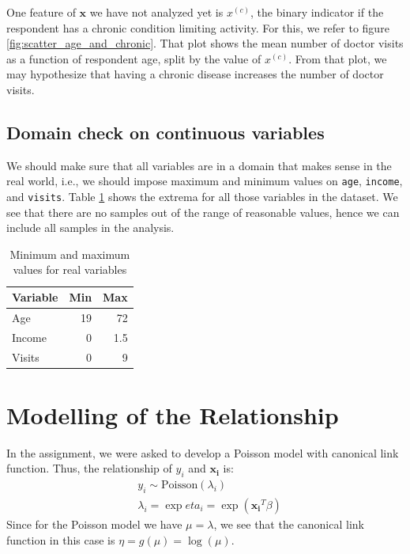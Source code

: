 \documentclass[a4paper,11pt]{article}
\begin{document}
One feature of $\mathbf{x}$ we have not analyzed yet is $x^{(c)}$, the binary indicator if the respondent has a chronic condition limiting activity. For this, we refer to figure \ref{fig:scatter_age_and_chronic}.  That plot shows the mean number of doctor visits as a function of respondent age, split by the value of $x^{(c)}$. From that plot, we may hypothesize that having a chronic disease increases the number of doctor visits. 

\subsection{Domain check on continuous variables}

We should make sure that all variables are in a domain that makes sense in the real world, i.e., we should impose maximum and minimum values on \texttt{age}, \texttt{income}, and \texttt{visits}. Table \ref{tab:min-max} shows the extrema for all those variables in the dataset. We see that there are no samples out of the range of reasonable values, hence we can include all samples in the analysis.

\begin{table}[h]
\centering
\begin{tabular}{|l|r|r|}
\hline
Variable & Min & Max\\
\hline
Age & 19 & 72 \\
Income & 0 & 1.5 \\
Visits & 0 & 9 \\
\hline
\end{tabular}
\caption{Minimum and maximum values for real variables}
\label{tab:min-max}

\end{table}


\section{Modelling of the Relationship}
In the assignment, we were asked to develop a Poisson model with canonical link function. Thus, the relationship of $y_i$ and $\mathbf{x_i}$ is:
\begin{align}
& y_i \sim \text{Poisson}(\lambda_i) \\
&\lambda_i = \exp{eta_i} = \exp(\mathbf{x_i}^T\beta)
    \label{eq:model}
\end{align}
Since for the Poisson model we have $\mu = \lambda$, we see that the canonical link function in this case is $\eta = g(\mu) = \log(\mu)$.
\end{document}
